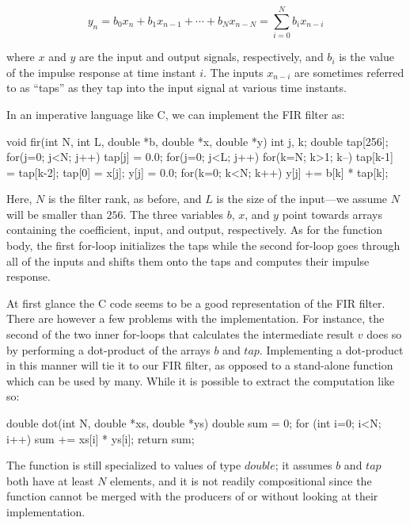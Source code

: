 \documentclass[../paper.tex]{subfiles}
\begin{document}
\begin{equation}
y_{n} = b_{0} x_{n} + b_{1} x_{n-1} + \cdots + b_{N} x_{n-N} = \sum_{i=0}^{N} b_{i} x_{n-i}
\end{equation}
\vspace{1mm}

\noindent where $x$ and $y$ are the input and output signals, respectively, and $b_i$ is the value of the impulse response at time instant $i$. The inputs $x_{n-i}$ are sometimes referred to as ``taps'' as they tap into the input signal at various time instants. 

In an imperative language like C, we can implement the FIR filter as:

\begin{code}
void fir(int N, int L, double *b, double *x, double *y) {
 int j, k;
 double tap[256];
 for(j=0; j<N; j++) tap[j] = 0.0;
 for(j=0; j<L; j++) {
  for(k=N; k>1; k--) tap[k-1] = tap[k-2];
  tap[0] = x[j];
  y[j] = 0.0;
  for(k=0; k<N; k++) y[j] += b[k] * tap[k];
 }
}
\end{code}

\noindent Here, $N$ is the filter rank, as before, and $L$ is the size of the input---we assume $N$ will be smaller than $256$. The three variables $b$, $x$, and $y$ point towards arrays containing the coefficient, input, and output, respectively. As for the function body, the first for-loop initializes the taps while the second for-loop goes through all of the inputs and shifts them onto the taps and computes their impulse response.

At first glance the C code seems to be a good representation of the FIR filter. There are however a few problems with the implementation. For instance, the second of the two inner for-loops that calculates the intermediate result $v$ does so by performing a dot-product of the arrays $b$ and $tap$. Implementing a dot-product in this manner will tie it to our FIR filter, as opposed to a stand-alone function which can be used by many. While it is possible to extract the computation like so:

\begin{code}
double dot(int N, double *xs, double *ys) {
  double sum = 0;
  for (int i=0; i<N; i++) sum += xs[i] * ys[i];
  return sum;
}
\end{code}

\noindent The function is still specialized to values of type $double$; it assumes $b$ and $tap$ both have at least $N$ elements, and it is not readily compositional since the function cannot be merged with the producers of  or  without looking at their implementation.
\end{document}
